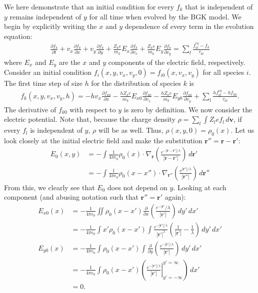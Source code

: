 \documentclass{article}
\begin{document}
We here demonstrate that an initial condition for every $f_k$ that is independent of $y$ remains independent of $y$ for all time when evolved by the BGK model. We begin by explicitly writing the $x$ and $y$ dependence of every term in the evolution equation:
\begin{align*}
\frac{\partial f_k}{\partial t}+v_x\frac{\partial f_k}{\partial x}+v_y\frac{\partial f_k}{\partial y}+\frac{Z_ke}{m_k}E_x\frac{\partial f_k}{\partial v_x}+\frac{Z_ke}{m_k}E_y\frac{\partial f_k}{\partial v_y}=\sum_l\frac{f_{kl}^{eq}-f_k}{\tau_{kl}}
\end{align*}
where $E_x$ and $E_y$ are the $x$ and $y$ components of the electric field, respectively. Consider an initial condition $f_i(x,y,v_x,v_y,0)=f_{i0}(x,v_x,v_y)$ for all species $i$. The first time step of size $h$ for the distribution of species $k$ is
\begin{align*}
f_k(x,y,v_x,v_y,h)=-hv_x\frac{\partial f_{k0}}{\partial x}-\frac{hZ_k e}{m_k}E_{x0}\frac{\partial f_{k0}}{\partial v_x}-\frac{hZ_k e}{m_k}E_{y0}\frac{\partial f_{k0}}{\partial v_y}+\sum_l\frac{hf_{kl}^{eq}-hf_{k0}}{\tau_{kl}}.
\end{align*}
The derivative of $f_{k0}$ with respect to $y$ is zero by definition. We now consider the electric potential. Note that, because the charge density $\rho=\sum_l\int Z_lef_{l}\,d\mathbf{v}$, if every $f_l$ is independent of $y$, $\rho$ will be as well. Thus, $\rho(x,y,0)=\rho_0(x)$. Let us look closely at the initial electric field and make the substitution $\mathbf{r}''=\mathbf{r}-\mathbf{r}'$: 
\begin{align*}
E_0(x,y)&=-\int \frac{1}{4\pi\epsilon_0}\rho_0(x)\cdot\nabla_\mathbf{r}\left(\frac{e^{-|\mathbf{r}-\mathbf{r}'|/\lambda}}{|\mathbf{r}-\mathbf{r}'|}\right)\,d\mathbf{r}'\\&=-\int\frac{1}{4\pi\epsilon_0}\rho_0(x-x'')\cdot\nabla_{\mathbf{r}''}\left(\frac{e^{|\mathbf{r}''|/\lambda}}{|\mathbf{r}''|}\right)\,d\mathbf{r}''
\end{align*}
From this, we clearly see that $E_0$ does not depend on $y$. Looking at each component (and abusing notation such that $\mathbf{r}''=\mathbf{r}'$ again):
\begin{align*}
 E_{x0}(x)&=-\frac{1}{4\pi\epsilon_0}\iint \rho_0(x-x')\frac{\partial}{\partial x}\left(\frac{e^{-|\mathbf{r}'}/\lambda}{|\mathbf{r}'|}\right)\,dy'\,dx'
\\
&=-\frac{1}{4\pi\epsilon_0}\int x'\rho_0(x-x')\int\frac{e^{-|\mathbf{r}'|/\lambda}}{|\mathbf{r}'|^2}\left(\frac{1}{|\mathbf{r}'|}-\frac{1}{\lambda}\right)\,dy'\,dx'\\
E_{y0}(x)&=-\frac{1}{4\pi\epsilon_0}\int\rho_0(x-x')\int\frac{\partial}{\partial y}\left(\frac{e^{-|\mathbf{r}'|/\lambda}}{|\mathbf{r}'|}\right)\,dy'\,dx'\\
&=-\frac{1}{4\pi\epsilon_0}\int\rho_0(x-x')\left(\left.\frac{e^{-|\mathbf{r}'|/\lambda}}{|\mathbf{r}'|}\right|_{y'=-\infty}^{y'=\infty}\right)\,dx'\\
&=0.
\end{align*}
\end{document}
